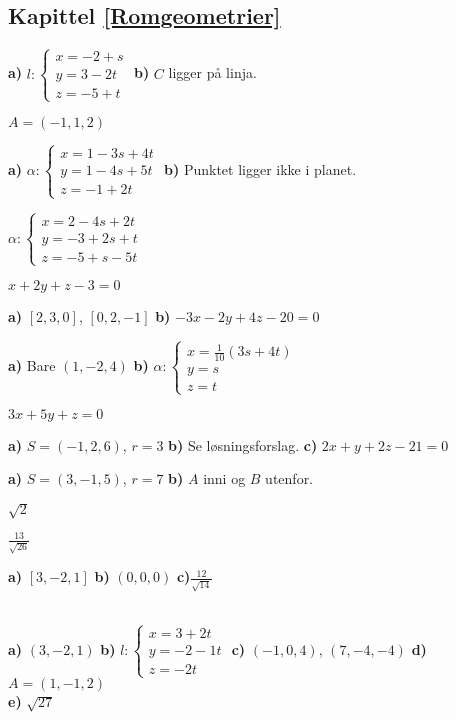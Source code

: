 



\subsection*{Kapittel \ref{Romgeometrier}}
\footnotesize
{} \textbf{a)} $ l: \left\lbrace{
	\begin{array}{l}
	x=-2 + s  \\
	y= 3-2t   \\
	z= -5+t 
	\end{array}
}\right. $ \textbf{b)} $ C $ ligger på linja.

 $ A=(-1, 1, 2) $

 \textbf{a)} $ \alpha: \left\lbrace{
	\begin{array}{l}
	x=1-3s+4t \\
	y=1-4s+5t \\
	z=-1 +2t
	\end{array}
}\right.  $ \textbf{b)} Punktet ligger ikke i planet.

 $ \alpha: \left\lbrace{
	\begin{array}{l}
	x=2-4s+2t \\
	y=-3+2s+t \\
	z=-5+s -5t
	\end{array}
}\right.  $

 $ x+2y+z-3=0 $

 \textbf{a)} $ [2, 3, 0] $, $ [0, 2, -1] $ \textbf{b)} $ -3x -2y+4z -20=0  $

\textbf{a)} Bare $ (1, -2, 4) $
\textbf{b)}
$ \alpha: \left\lbrace{
	\begin{array}{l}
	x=\frac{1}{10}(3s+4t) \\
	y=s \\
	z=t
	\end{array}
}\right.  $

 $ 3x+5y + z = 0 $

\textbf{a)} $ S=(-1, 2, 6) $, $ r=3 $ \textbf{b)} Se løsningsforslag. 
\textbf{c)} $ 2x + y + 2z - 21 =0$

\textbf{a)} $ S=(3, -1, 5) $, $ r=7 $ 
\textbf{b)} $ A $ inni og $ B $ utenfor.

 $ \sqrt{2} $

 $ \frac{13}{\sqrt{26}} $

 \textbf{a)} $ [3, -2, 1] $ \textbf{b)} $ (0, 0, 0) $ \textbf{c)}$ \frac{12}{\sqrt{14}} $

 \\
\textbf{a)} $ (3, -2, 1) $ \textbf{b) }$  l: \left\lbrace{
	\begin{array}{l}
	x=3+ 2t  \\
	y=-2-1t   \\
	z=-2t 
	\end{array}
}\right.  $  \textbf{c)} $ (-1, 0, 4) $, $ (7, -4, -4) $ \textbf{d)} $ A=(1, -1, 2) $\\
\textbf{e)} $ \sqrt{27} $

